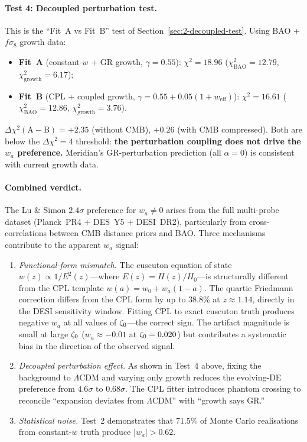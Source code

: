 \paragraph{Test 4: Decoupled perturbation test.}
This is the ``Fit~A vs Fit~B'' test of Section~\ref{sec:2-decoupled-test}. Using BAO + $f\sigma_8$ growth data:
\begin{itemize}
\item \textbf{Fit~A} (constant-$w$ + GR growth, $\gamma = 0.55$): $\chi^2 = 18.96$ ($\chi^2_\mathrm{BAO} = 12.79$, $\chi^2_\mathrm{growth} = 6.17$);
\item \textbf{Fit~B} (CPL + coupled growth, $\gamma = 0.55 + 0.05(1+w_\mathrm{eff})$): $\chi^2 = 16.61$ ($\chi^2_\mathrm{BAO} = 12.86$, $\chi^2_\mathrm{growth} = 3.76$).
\end{itemize}
$\Delta\chi^2(\mathrm{A} - \mathrm{B}) = +2.35$ (without CMB), $+0.26$ (with CMB compressed). Both are below the $\Delta\chi^2 = 4$ threshold: \textbf{the perturbation coupling does not drive the $w_a$ preference.} Meridian's GR-perturbation prediction (all $\alpha = 0$) is consistent with current growth data.

\paragraph{Combined verdict.} The Lu \& Simon $2.4\sigma$ preference for $w_a \neq 0$ arises from the full multi-probe dataset (Planck~PR4 + DES~Y5 + DESI~DR2), particularly from cross-correlations between CMB distance priors and BAO. Three mechanisms contribute to the apparent $w_a$ signal:

\begin{enumerate}
\item \emph{Functional-form mismatch.} The cuscuton equation of state $w(z) \propto 1/E^2(z)$---where $E(z) = H(z)/H_0$---is structurally different from the CPL template $w(a) = w_0 + w_a(1 - a)$. The quartic Friedmann correction differs from the CPL form by up to 38.8\% at $z \approx 1.14$, directly in the DESI sensitivity window. Fitting CPL to exact cuscuton truth produces negative $w_a$ at all values of $\zeta_0$---the correct sign. The artifact magnitude is small at large $\zeta_0$ ($w_a \approx -0.01$ at $\zeta_0 = 0.020$) but contributes a systematic bias in the direction of the observed signal.

\item \emph{Decoupled perturbation effect.} As shown in Test~4 above, fixing the background to $\Lambda$CDM and varying only growth reduces the evolving-DE preference from $4.6\sigma$ to $0.68\sigma$. The CPL fitter introduces phantom crossing to reconcile ``expansion deviates from $\Lambda$CDM'' with ``growth says GR.''

\item \emph{Statistical noise.} Test~2 demonstrates that 71.5\% of Monte Carlo realisations from constant-$w$ truth produce $|w_a| > 0.62$.
\end{enumerate}

